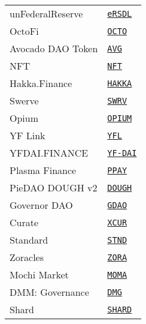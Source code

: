 \begin{tabular}{ll}
unFederalReserve & \href{https://etherscan.io/address/0x5218E472cFCFE0b64A064F055B43b4cdC9EfD3A6}{\tt eRSDL} \\
OctoFi & \href{https://etherscan.io/address/0x7240aC91f01233BaAf8b064248E80feaA5912BA3}{\tt OCTO} \\
Avocado DAO Token & \href{https://etherscan.io/address/0xa41f142b6eb2b164f8164cae0716892ce02f311f}{\tt AVG} \\
NFT & \href{https://etherscan.io/address/0xcB8d1260F9c92A3A545d409466280fFdD7AF7042}{\tt NFT} \\
Hakka.Finance & \href{https://etherscan.io/address/0x0e29e5abbb5fd88e28b2d355774e73bd47de3bcd}{\tt HAKKA} \\
Swerve & \href{https://etherscan.io/address/0xb8baa0e4287890a5f79863ab62b7f175cecbd433}{\tt SWRV} \\
Opium & \href{https://etherscan.io/address/0x888888888889c00c67689029d7856aac1065ec11}{\tt OPIUM} \\
YF Link & \href{https://etherscan.io/address/0x28cb7e841ee97947a86B06fA4090C8451f64c0be}{\tt YFL} \\
YFDAI.FINANCE & \href{https://etherscan.io/address/0xf4CD3d3Fda8d7Fd6C5a500203e38640A70Bf9577}{\tt YF-DAI} \\
Plasma Finance & \href{https://etherscan.io/address/0x054d64b73d3d8a21af3d764efd76bcaa774f3bb2}{\tt PPAY} \\
PieDAO DOUGH v2 & \href{https://etherscan.io/address/0xad32A8e6220741182940c5aBF610bDE99E737b2D}{\tt DOUGH} \\
Governor DAO & \href{https://etherscan.io/address/0x515d7e9d75e2b76db60f8a051cd890eba23286bc}{\tt GDAO} \\
Curate & \href{https://etherscan.io/address/0xE1c7E30C42C24582888C758984f6e382096786bd}{\tt XCUR} \\
Standard & \href{https://etherscan.io/address/0x9040e237C3bF18347bb00957Dc22167D0f2b999d}{\tt STND} \\
Zoracles & \href{https://etherscan.io/address/0xD8E3FB3b08eBA982F2754988d70D57eDc0055ae6}{\tt ZORA} \\
Mochi Market & \href{https://etherscan.io/address/0xbd1848e1491d4308ad18287a745dd4db2a4bd55b}{\tt MOMA} \\
DMM: Governance & \href{https://etherscan.io/address/0xEd91879919B71bB6905f23af0A68d231EcF87b14}{\tt DMG} \\
Shard & \href{https://etherscan.io/address/0xbebdab6da046bc49ffbb61fbd7b33157eb270d05}{\tt SHARD} \\

\end{tabular}
